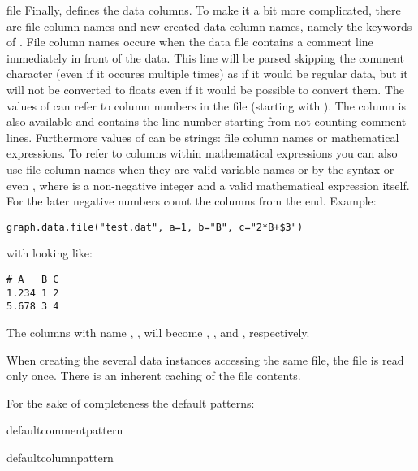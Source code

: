 \begin{classdesc}{file}
  Finally,  defines the data columns. To make it a bit
  more complicated, there are file column names and new created data
  column names, namely the keywords of . File column
  names occure when the data file contains a comment line immediately
  in front of the data. This line will be parsed skipping the comment
  character (even if it occures multiple times) as if it would be
  regular data, but it will not be converted to floats even if it
  would be possible to convert them. The values of  can
  refer to column numbers in the file (starting with ). The
  column  is also available and contains the line number
  starting from  not counting comment lines. Furthermore
  values of  can be strings: file column names or
  mathematical expressions. To refer to columns within mathematical
  expressions you can also use file column names when they are valid
  variable names or by the syntax  or even , where 
  is a non-negative integer and  a valid mathematical expression itself. For
  the later negative numbers count the columns from the end.
  Example:
  \begin{verbatim}
graph.data.file("test.dat", a=1, b="B", c="2*B+$3")
  \end{verbatim}
  with  looking like:
  \begin{verbatim}
# A   B C
1.234 1 2
5.678 3 4
  \end{verbatim}
  The columns with name , ,  will become
  \samp{[1.234, 5.678]}, \samp{[1.0, 3.0]}, and \samp{[4.0, 10.0]},
  respectively.

  When creating the several data instances accessing the same file,
  the file is read only once. There is an inherent caching of the
  file contents.
\end{classdesc}

For the sake of completeness the default patterns:

\begin{memberdesc}{defaultcommentpattern}
\end{memberdesc}

\begin{memberdesc}{defaultcolumnpattern}
\end{memberdesc}

